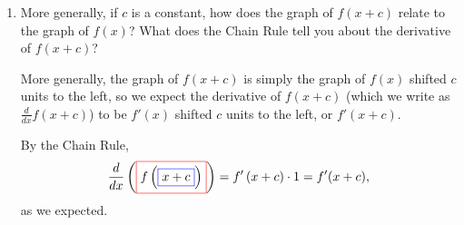 \documentclass{article}
\begin{document}
\begin{enumerate}
\begin{enumerate}
  \item
    \begin{problem}[\vfill]
      More generally, if $c$ is a constant, how does the graph of $f(x +
      c)$ relate to the graph of $f(x)$?  What does the Chain Rule tell
      you about the derivative of $f(x + c)$?
    \end{problem}

    \begin{solution}
      More generally, 
      the graph of $f(x + c)$ is simply the graph of $f(x)$ shifted $c$
      units to the left, so we expect the derivative of $f(x + c)$ (which
      we write as $\frac{d}{dx} f(x + c)$) to be $f'(x)$ shifted $c$ units
      to the left, or $f'(x + c)$. 

      By the Chain Rule,     
      \[ \frac{d}{dx} \left(\fcolorbox{red}{white}{$\displaystyle
          f\left(\fcolorbox{blue}{white}{$\displaystyle x+
              c$}\right)$}\right) = f'\left(x+ c\right)\cdot 1 = f'(x +
      c),\] as we expected. 
    \end{solution}    

  \end{enumerate}

\end{enumerate}
\end{document}
